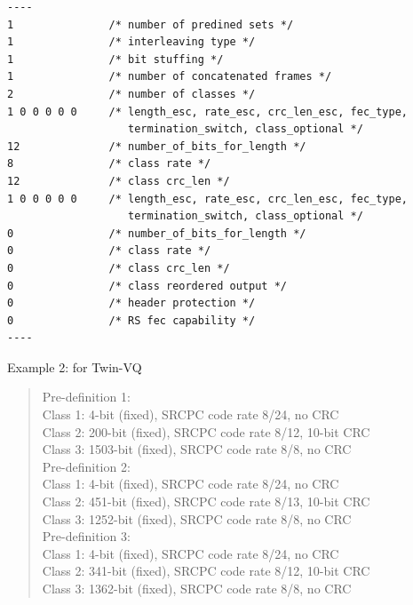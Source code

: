 \documentclass[a4paper]{article}
\begin{document}
\begin{verbatim}
----
1               /* number of predined sets */
1               /* interleaving type */
1               /* bit stuffing */
1               /* number of concatenated frames */               
2               /* number of classes */
1 0 0 0 0 0     /* length_esc, rate_esc, crc_len_esc, fec_type, 
                   termination_switch, class_optional */
12              /* number_of_bits_for_length */
8               /* class rate */
12              /* class crc_len */
1 0 0 0 0 0     /* length_esc, rate_esc, crc_len_esc, fec_type, 
                   termination_switch, class_optional */
0               /* number_of_bits_for_length */
0               /* class rate */
0               /* class crc_len */
0               /* class reordered output */
0               /* header protection */
0               /* RS fec capability */
----

\end{verbatim}
  
Example 2: for Twin-VQ 
\begin{quote}
  Pre-definition 1: \\
    Class 1: 4-bit (fixed), SRCPC code rate 8/24, no CRC \\
    Class 2: 200-bit (fixed), SRCPC code rate 8/12, 10-bit CRC \\
    Class 3: 1503-bit (fixed), SRCPC code rate 8/8, no CRC \\
  Pre-definition 2: \\
    Class 1: 4-bit (fixed), SRCPC code rate 8/24, no CRC \\
    Class 2: 451-bit (fixed), SRCPC code rate 8/13, 10-bit CRC \\
    Class 3: 1252-bit (fixed), SRCPC code rate 8/8, no CRC \\
  Pre-definition 3: \\
    Class 1: 4-bit (fixed), SRCPC code rate 8/24, no CRC \\
    Class 2: 341-bit (fixed), SRCPC code rate 8/12, 10-bit CRC \\
    Class 3: 1362-bit (fixed), SRCPC code rate 8/8, no CRC
\end{quote}
\end{document}
